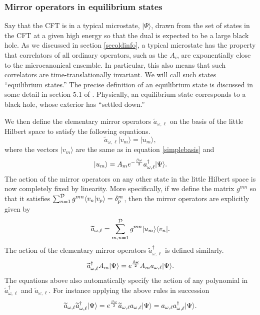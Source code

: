 \documentclass[12pt]{article}
\newcommand{\cop}[1]{#1}
\newcommand{\al}{\cop{A}} %
\def\ta{\widetilde{\cop{a}}}
\newcommand{\be}{\begin{equation}}
\newcommand{\ee}{\end{equation}}
\begin{document}
\subsubsection{\bf Mirror operators in equilibrium states}
Say that the CFT is in a typical microstate, $|\Psi \rangle$, drawn from the set of states in the CFT at a given high energy so that the dual is expected to be a large black hole. As we discussed in section \ref{secoldinfo}, a  typical microstate has the property that correlators of all ordinary operators, such as the $\al_i$, are exponentially close to the microcanonical ensemble. In particular, this also means that such correlators are time-translationally invariant. We will call such states ``equilibrium states.''  The precise definition of an equilibrium state is discussed in some detail in section 5.1 of \cite{Papadodimas:2013jku}. Physically, an equilibrium state corresponds to a black hole, whose exterior has ``settled down.''

We then define the elementary mirror operators $\ta_{\omega, \ell}$ on the basis of the little Hilbert space to satisfy the following equations.
\be
\label{taelemdef}
\ta_{\omega, \ell} |v_m \rangle = |u_m \rangle,
\ee
where the vectors $|v_m \rangle$ are the same as in equation \eqref{simplebasis} and 
\be
\label{mirroraction}
|u_m \rangle = \al_m e^{-{\beta \omega \over 2}} a_{\omega, \ell}^{\dagger} |\Psi \rangle.
\ee
The action of the mirror operators on any other state in the little Hilbert space is now completely fixed by linearity.
More specifically, if we define the matrix $g^{m n}$  so that it satisfies $\sum_{n=1}^{{\cal D}} g^{m n} \langle v_n | v_p \rangle = \delta^m_p$, then the mirror operators are explicitly given by
\be
\label{taexplicit}
\ta_{\omega, \ell} = \sum_{m,n=1}^{{\cal D}}g^{m n} |u_m \rangle \langle v_n|.
\ee
The action of the elementary mirror operators $\ta_{\omega, \ell}^{\dagger}$ is defined similarly. 
\be
\label{tadagdef}
\ta_{\omega, \ell}^{\dagger} \al_m |\Psi \rangle =  e^{\beta \omega \over 2} \al_m a_{\omega, \ell} |\Psi \rangle.
\ee
The equations above also automatically specify the action of any polynomial in $\ta_{\omega, \ell}^{\dagger}$ and $\ta_{\omega, \ell}$. For instance applying the above rules in succession
\be
\label{numbermirror}
\ta_{\omega, \ell} \ta_{\omega, \ell}^{\dagger} |\Psi \rangle =  e^{\beta \omega \over 2} \ta_{\omega, \ell} a_{\omega, \ell} |\Psi \rangle = a_{\omega, \ell} a^{\dagger}_{\omega, \ell} |\Psi \rangle.
\ee
\end{document}
